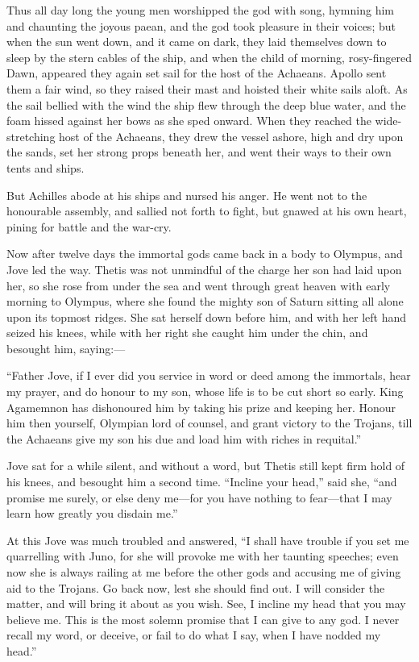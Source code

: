 Thus all day long the young men worshipped the god with song, hymning him
and chaunting the joyous paean, and the god took pleasure in their voices;
but when the sun went down, and it came on dark, they laid themselves down
to sleep by the stern cables of the ship, and when the child of morning,
rosy-fingered Dawn, appeared they again set sail for the host of the
Achaeans. Apollo sent them a fair wind, so they raised their mast and
hoisted their white sails aloft. As the sail bellied with the wind the
ship flew through the deep blue water, and the foam hissed against her
bows as she sped onward. When they reached the wide-stretching host of the
Achaeans, they drew the vessel ashore, high and dry upon the sands, set
her strong props beneath her, and went their ways to their own tents and
ships.

But Achilles abode at his ships and nursed his anger. He went not to the
honourable assembly, and sallied not forth to fight, but gnawed at his own
heart, pining for battle and the war-cry.

Now after twelve days the immortal gods came back in a body to Olympus,
and Jove led the way. Thetis was not unmindful of the charge her son had
laid upon her, so she rose from under the sea and went through great
heaven with early morning to Olympus, where she found the mighty son of
Saturn sitting all alone upon its topmost ridges. She sat herself down
before him, and with her left hand seized his knees, while with her right
she caught him under the chin, and besought him, saying:—

“Father Jove, if I ever did you service in word or deed among the
immortals, hear my prayer, and do honour to my son, whose life is to be
cut short so early. King Agamemnon has dishonoured him by taking his prize
and keeping her. Honour him then yourself, Olympian lord of counsel, and
grant victory to the Trojans, till the Achaeans give my son his due and
load him with riches in requital.”

Jove sat for a while silent, and without a word, but Thetis still kept
firm hold of his knees, and besought him a second time. “Incline your
head,” said she, “and promise me surely, or else deny me—for you
have nothing to fear—that I may learn how greatly you disdain me.”

At this Jove was much troubled and answered, “I shall have trouble if you
set me quarrelling with Juno, for she will provoke me with her taunting
speeches; even now she is always railing at me before the other gods and
accusing me of giving aid to the Trojans. Go back now, lest she should
find out. I will consider the matter, and will bring it about as you wish.
See, I incline my head that you may believe me. This is the most solemn
promise that I can give to any god. I never recall my word, or deceive, or
fail to do what I say, when I have nodded my head.”


